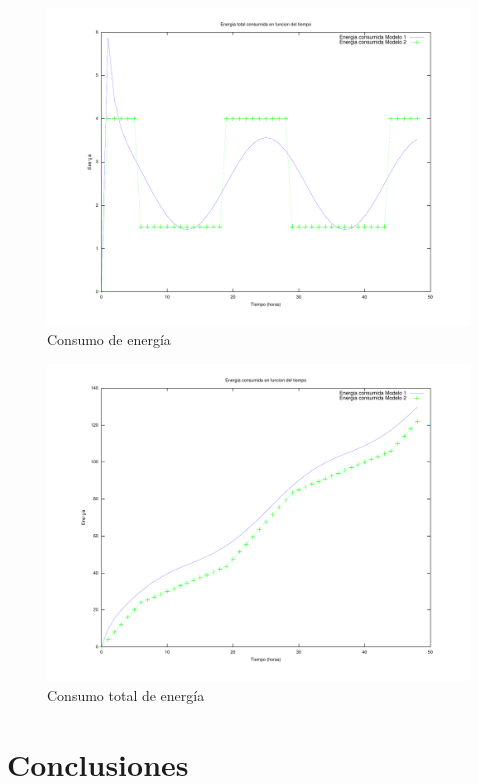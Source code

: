 \documentclass{sig-alternate}
\begin{document}
\begin{figure}[hp]
\label{consumo_energia}
\centering
\includegraphics[scale=.8]{graficos/energia}
\caption{Consumo de energ\'{i}a}
\end{figure}

\begin{figure}[hp]
\label{consumo_energia_total}
\centering
\includegraphics[scale=.8]{graficos/energiatotal}
\caption{Consumo total de energ\'{i}a}
\end{figure}


\section{Conclusiones}\label{conclusiones}

\end{document}
